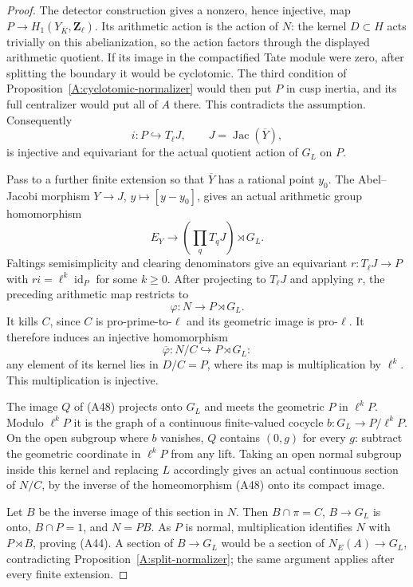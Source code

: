 \begin{proof}
The detector construction gives a nonzero,
hence injective, map
$P\to H_1(Y_{\overline K},\mathbf Z_\ell)$.
Its arithmetic action is the action of $N$:
the kernel $D\subset H$ acts trivially on this
abelianization, so the action factors through
the displayed arithmetic quotient.
If its image in the compactified Tate module
were zero, after splitting the boundary it
would be cyclotomic. The third condition of
Proposition~\ref{A:cyclotomic-normalizer} would
then put $P$ in cusp inertia, and its full
centralizer would put all of $A$ there.
This contradicts the assumption. Consequently
\[
             i:P\hookrightarrow T_\ell J,
       \qquad J=\operatorname{Jac}(\overline Y),
                                                        \tag{A46}
\]
is injective and equivariant for the actual
quotient action of $G_L$ on $P$.

Pass to a further finite extension so that
$\overline Y$ has a rational point $y_0$.
The Abel--Jacobi morphism
$Y\to J$, $y\mapsto[y-y_0]$, gives an actual
arithmetic group homomorphism
\[
                  E_Y\longrightarrow
                  \left(\prod_qT_qJ\right)\rtimes G_L.
\]
Faltings semisimplicity and clearing denominators
give an equivariant $r:T_\ell J\to P$ with
$r i=\ell^k\operatorname{id}_P$ for some $k\ge0$.
After projecting to $T_\ell J$ and applying $r$,
the preceding arithmetic map restricts to
\[
                  \varphi:N\longrightarrow P\rtimes G_L.
                                                        \tag{A47}
\]
It kills $C$, since $C$ is pro-prime-to-$\ell$
and its geometric image is pro-$\ell$. It
therefore induces an injective homomorphism
\[
             \overline\varphi:N/C\hookrightarrow P\rtimes G_L:
                                                        \tag{A48}
\]
any element of its kernel lies in $D/C=P$,
where its map is multiplication by $\ell^k$.
This multiplication is injective.

The image $Q$ of (A48) projects onto $G_L$
and meets the geometric $P$ in $\ell^kP$.
Modulo $\ell^kP$ it is the graph of a
continuous finite-valued cocycle
$b:G_L\to P/\ell^kP$. On the open subgroup
where $b$ vanishes, $Q$ contains $(0,g)$
for every $g$: subtract the geometric
coordinate in $\ell^kP$ from any lift.
Taking an open normal subgroup inside this
kernel and replacing $L$ accordingly gives
an actual continuous section of $N/C$,
by the inverse of the homeomorphism (A48)
onto its compact image.

Let $B$ be the inverse image of this section
in $N$. Then $B\cap\pi=C$, $B\to G_L$
is onto, $B\cap P=1$, and $N=PB$.
As $P$ is normal, multiplication identifies
$N$ with $P\rtimes B$, proving (A44).
A section of $B\to G_L$ would be a section
of $N_E(A)\to G_L$, contradicting
Proposition~\ref{A:split-normalizer}; the same
argument applies after every finite extension.
\end{proof}


